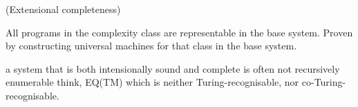 \begin{definition} (Extensional completeness)

All programs in the complexity class are representable in the base system.
Proven by constructing universal machines for that class in the base system.

\end{definition}

a system that is both intensionally sound and complete is often not recursively
enumerable think, EQ(TM) which is neither Turing-recognisable, nor
co-Turing-recognisable.

